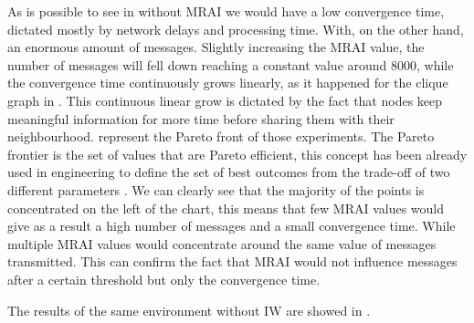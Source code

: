 As is possible to see in 
without \ac{MRAI} we would have a low convergence time, dictated mostly by 
network delays and processing time. With, on the other hand, an enormous amount
of messages.
Slightly increasing the \ac{MRAI} value, the number of messages will fell down
reaching a constant value around \num{8000}, while the convergence time
continuously grows linearly, as it happened for the clique graph in .
This continuous linear grow is dictated by the fact that nodes keep meaningful
information for more time before sharing them with their neighbourhood.
 represent the Pareto
front of those experiments.
The Pareto frontier is the set of values that are Pareto efficient, this concept
has been already used in engineering to define the set of best outcomes from
the trade-off of two different parameters \cite{goodarzi2014introduction}.
We can clearly see that the majority of the points is concentrated on the left
of the chart, this means that few \ac{MRAI} values would give as a result
a high number of messages and a small convergence time.
While multiple \ac{MRAI} values would concentrate around the same value of 
messages transmitted.
This can confirm the fact that \ac{MRAI} would not influence messages
after a certain threshold but only the convergence time.

The results of the same environment without \ac{IW} are showed in 
.

